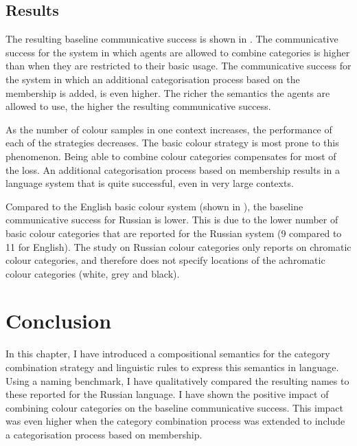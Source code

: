 \subsection{Results}

The resulting baseline communicative success is shown in . The communicative success for the system in
which agents are allowed to combine categories is higher than when
they are restricted to their basic usage. The communicative success
for the system in which an additional categorisation process based on
the membership is added, is even higher. The richer the semantics the
agents are allowed to use, the higher the resulting communicative
success.

As the number of colour samples in one context increases, the
performance of each of the strategies decreases. The basic
  colour strategy is most prone to this phenomenon. Being able to
combine colour categories compensates for most of the loss. An
additional categorisation process based on membership results in a
language system that is quite successful, even in very large contexts.

Compared to the English basic colour system (shown in ), the baseline communicative success for Russian
is lower. This is due to the lower number of basic colour categories
that are reported for the Russian system (9 compared to 11 for
English). The study on Russian colour categories only reports on
chromatic colour categories, and therefore does not specify locations
of the achromatic colour categories (white, grey and black).


\section{Conclusion}

In this chapter, I have introduced a compositional semantics for the
category combination strategy and linguistic rules to express
this semantics in language. Using a naming benchmark, I have
qualitatively compared the resulting names to these reported for the
Russian language. I have shown the positive impact of combining
colour categories on the baseline communicative success. This impact
was even higher when the category combination process was extended
to include a categorisation process based on membership.

\newpage
\thispagestyle{empty}
